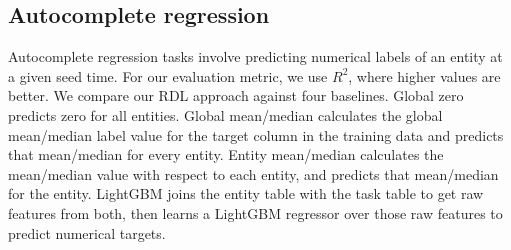 \documentclass{article} %
\newcommand{\relbench}{\textsc{RelBench}\xspace}
\begin{document}
\begin{table}[t]
  \centering
  \caption{{\bf Autocomplete binary classification results on \relbench.} Binary classification uses the AUROC metric (higher is better). Best values are in bold. Standard baselines of random choice and majority class both correspond to AUROC values of approximately $50.00$, so we exclude them below. See Table \ref{tab:autocomplete_classification_appendix} for standard deviations.}
  \label{tab:autocomplete_classification_main}
  \renewcommand{\arraystretch}{1.1}
    \vspace{-5pt}
    \begin{adjustbox}{max width=0.6\textwidth, center}
    
    \end{adjustbox}
  \vspace{-10pt}
\end{table}


\begin{table}[t]
  \centering
  \caption{{\bf Autocomplete multiclass classification results on \relbench.} Multiclass classification uses the accuracy metric (higher is better). Best values are in bold. See Table \ref{tab:autocomplete_multiclass_appendix} for std. devs.}
  \label{tab:autocomplete_multiclass_main}
  \renewcommand{\arraystretch}{1.1}
  \scriptsize
  \vspace{-5pt}
    \begin{adjustbox}{max width=0.65\textwidth, center}
    
    \end{adjustbox}
\end{table}

\subsection{Autocomplete regression} \label{sec:autocomplete-regression}

Autocomplete regression tasks involve predicting numerical labels of an entity at a given seed time. For our evaluation metric, we use $R^2$, where higher values are better. We compare our RDL approach against four baselines. Global zero predicts zero for all entities. Global mean/median calculates the global mean/median label value for the target column in the training data and predicts that mean/median for every entity. Entity mean/median calculates the mean/median value with respect to each entity, and predicts that mean/median for the entity. LightGBM joins the entity table with the task table to get raw features from both, then learns a LightGBM \citep{ke2017lightgbm} regressor over those raw features to predict numerical targets.
\end{document}
